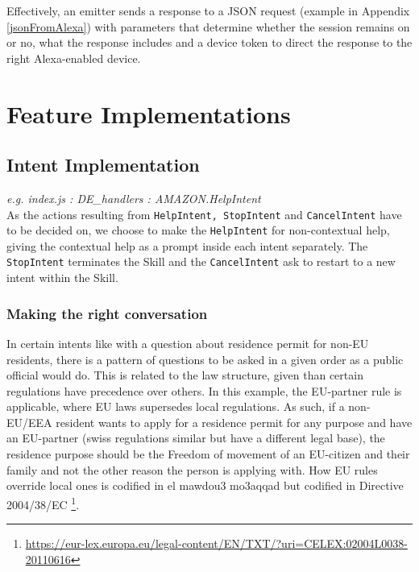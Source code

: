 Effectively, an emitter sends a response to a JSON request (example in Appendix \ref{jsonFromAlexa}) with parameters that determine whether the session remains on or no, what the response includes and a device token to direct the response to the right Alexa-enabled device.



















\section[Features]{Feature Implementations}



\subsection*{Intent Implementation}
\textit{e.g. index.js \quad : \quad  DE\_handlers \quad :  \quad AMAZON.HelpIntent}\\
As the actions resulting from \texttt{HelpIntent, StopIntent} and \texttt{CancelIntent}
have to be decided on, we choose to make the \texttt{HelpIntent} for non-contextual help, giving the contextual help as a prompt inside each intent separately.
The \texttt{StopIntent} terminates the Skill and the \texttt{CancelIntent} ask to restart to a new intent within the Skill.


\subsubsection*{Making the right conversation}
In certain intents like with a question about residence permit for non-EU residents, there is a pattern of questions to be asked in a given order as a public official would do. This is related to the law structure, given than certain regulations have precedence over others. In this example, the EU-partner rule is applicable, where EU laws supersedes local regulations.
As such, if a non-EU/EEA resident wants to apply for a residence permit for any purpose and have an EU-partner (swiss regulations similar but have a different legal base), the residence purpose should be the Freedom of movement of an EU-citizen and their family and not the other reason the person is applying with.
How EU rules override local ones is codified in
el mawdou3 mo3aqqad but codified in Directive 2004/38/EC \footnote{
\url{https://eur-lex.europa.eu/legal-content/EN/TXT/?uri=CELEX:02004L0038-20110616}}.



